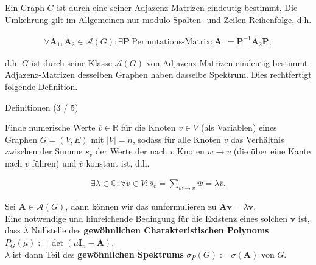 \documentclass[aspectratio=169]{beamer}
\begin{document}
  
\begin{frame}{}
  
  \begin{remark*}
    Ein Graph $G$ ist durch eine seiner Adjazenz-Matrizen eindeutig bestimmt.
    Die Umkehrung gilt im Allgemeinen nur modulo Spalten- und Zeilen-Reihenfolge, d.h.

    \begin{align*}
      \forall \mathbf A_1, \mathbf A_2 \in \mathcal A(G):
        \exists \mathbf P ~\text{Permutations-Matrix}:
          \mathbf A_1 = \mathbf P^{-1} \mathbf A_2 \mathbf P,
    \end{align*}

    d.h. $G$ ist durch seine Klasse $\mathcal A(G)$ von Adjazenz-Matrizen eindeutig bestimmt.
    Adjazenz-Matrizen desselben Graphen haben dasselbe Spektrum.
    Dies rechtfertigt folgende Definition.
    
  \end{remark*}

\end{frame}

\begin{frame}{Definitionen (3 / 5)}
  
  \begin{definition*}
    
    Finde numerische Werte $\overline v \in \mathbb R$ für die Knoten $v \in V$ (als Variablen) eines Graphen $G = (V, E)$ mit $|V| = n$, sodass für alle Knoten $v$ das Verhältnis zwischen der Summe $\overline s_v$ der Werte der nach $v$ Knoten $w \to v$ (die über eine Kante nach $v$ führen) und $\overline v$ konstant ist, d.h.
  
    \begin{align*}
      \exists \lambda \in \mathbb C:
        \forall v \in V:
          \overline s_v = \sum_{w \to v} \overline w = \lambda \overline v.
    \end{align*}
  
    Sei $\mathbf A \in \mathcal A(G)$, dann können wir das umformulieren zu $\mathbf A \mathbf v = \lambda \mathbf v$. \\
    Eine notwendige und hinreichende Bedingung für die Existenz eines solchen $\mathbf v$ ist, dass $\lambda$ Nullstelle des \textbf{gewöhnlichen Charakteristischen Polynoms} $P_G(\mu) := \det(\mu \mathbf I_n - \mathbf A)$. \\
    $\lambda$ ist dann Teil des \textbf{gewöhnlichen Spektrums} $\sigma_P(G) := \sigma(\mathbf A)$ von $G$.

  \end{definition*}

\end{frame}
\end{document}
